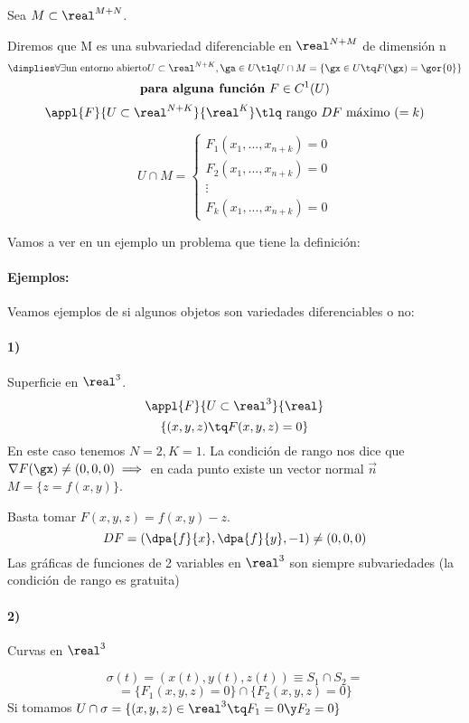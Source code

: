   
  \begin{defn}
  Sea $M \subset \real^{M+N}$.
  
  Diremos que M es una subvariedad diferenciable en $\real^{N+M}$ de dimensión n \[\dimplies \forall \exists \text{un entorno abierto} U \subset \real^{N+K}, \ga \in U \tlq U\cap M = \{\gx\in U\tq F(\gx) = \gor{0}\} \]\[\text{\textbf{para alguna función} } F\in C^1(U)\]
  \[\appl{F}{U\subset \real^{N+K}}{\real^K} \tlq \text{ rango } DF \text{ máximo } (=k)\]
  
  \[U\cap M = \left\{\begin{array}{cc}
                     F_1(x_1,...,x_{n+k}) = 0\\
                     F_2(x_1,...,x_{n+k}) = 0\\
                     \vdots\\
                     F_k(x_1,...,x_{n+k}) = 0
                    \end{array}\right.\] 
  \end{defn}
  Vamos a ver en un ejemplo un problema que tiene la definición:  
  \paragraph{Ejemplos:}
Veamos ejemplos de si algunos objetos son variedades diferenciables o no:
\paragraph{1)}
  Superficie en $\real^3$.
  \[\appl{F}{U\subset\real^3}{\real}\]
  \[\{(x,y,z) \tq F(x,y,z) = 0\}\]
  En este caso tenemos $N=2, K=1$.
  La condición de rango nos dice que $\nabla F(\gx) \neq (0,0,0) \implies $ en cada punto existe un vector normal $\overrightarrow{n}$
  \obs $M = \{z = f(x,y)\}$.
  
  Basta tomar $F(x,y,z) = f(x,y)-z$.
  \[DF = \left(\dpa{f}{x},\dpa{f}{y},-1\right) \neq (0,0,0)\]
  Las gráficas de funciones de 2 variables en $\real^3$ son siempre subvariedades (la condición de rango es gratuita)
  
\paragraph{2)}  Curvas en $\real^3$
  
  \[\sigma(t) = (x(t),y(t),z(t))\equiv S_1 \cap S_2 = \]
  \[= \{F_1(x,y,z) = 0\}\cap \{F_2(x,y,z) = 0\}\]
  Si tomamos $U\cap \sigma = \{(x,y,z)\in\real^3 \tq F_1 = 0 \y F_2 = 0\}$

